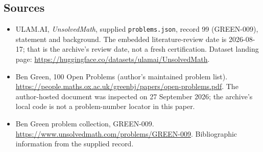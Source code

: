 \documentclass[11pt,a4paper]{article}
\begin{document}
\subsection{Sources}

{\small

\begin{itemize}

\item[\hypertarget{source:99:1}{S1}] ULAM.AI, \emph{UnsolvedMath}, supplied \texttt{problems.json}, record 99 (GREEN-009), statement and background. The embedded literature-review date is 2026-08-17; that is the archive’s review date, not a fresh certification. Dataset landing page: \url{https://huggingface.co/datasets/ulamai/UnsolvedMath}.

\item[\hypertarget{source:99:2}{S2}] Ben Green, 100 Open Problems (author’s maintained problem list). \url{https://people.maths.ox.ac.uk/greenbj/papers/open-problems.pdf}. The author-hosted document was inspected on 27 September 2026; the archive’s local code is not a problem-number locator in this paper.

\item[\hypertarget{source:99:3}{S3}] Ben Green problem collection, GREEN-009. \url{https://www.unsolvedmath.com/problems/GREEN-009}. Bibliographic information from the supplied record.

\end{itemize}

}

\label{end:99}
\end{document}
